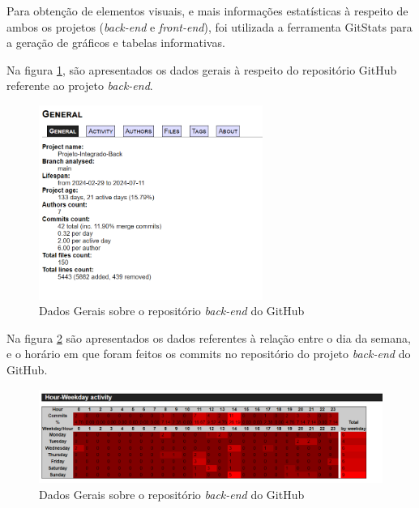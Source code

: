 Para obtenção de elementos visuais, e mais informações estatísticas à respeito de ambos os projetos (\textit{back-end} e \textit{front-end}), foi utilizada a ferramenta GitStats para a geração de gráficos e tabelas informativas.


Na figura \ref{fig:dadosGeraisRepositorioBack}, são apresentados os dados gerais à respeito do repositório GitHub referente ao projeto \textit{back-end}.

\begin{figure}[ht]
        \centering
\includegraphics[width=0.65\textwidth]{images/dados-gerais-stats-back.png}
        \caption{Dados Gerais sobre o repositório \textit{back-end} do GitHub}
        \label{fig:dadosGeraisRepositorioBack}
    \end{figure}

\newpage

Na figura \ref{fig:dadosCommitsDiasBack} são apresentados os dados referentes à relação entre o dia da semana, e o horário em que foram feitos os commits no repositório do projeto \textit{back-end} do GitHub.

\begin{figure}[ht]
        \centering
\includegraphics[width=1.0\textwidth]{images/commits-hora-semana-stats-back.png}
        \caption{Dados Gerais sobre o repositório \textit{back-end} do GitHub}
        \label{fig:dadosCommitsDiasBack}
    \end{figure}

